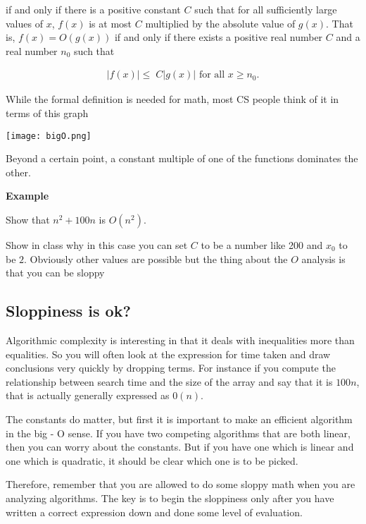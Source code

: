 \documentclass[12pt]{article}
\begin{document}
if and only if there is a positive constant $C$ such that for all sufficiently large values of $x$, $f(x)$ is at most $C$ multiplied by the absolute value of $g(x)$. That is, $f(x) = O(g(x))$ if and only if there exists a positive real number $C$ and a real number $n_0$ such that

\begin{align*}
|f(x)| \le \; C |g(x)|\text{ for all }x \ge n_0.
\end{align*}

While the formal definition is needed for math, most CS people think of it in terms of this graph

\texttt{[image: bigO.png]}

Beyond a certain point, a constant multiple of one of the functions dominates the other.

\medskip

\textbf{Example}

Show that $n^2 + 100n$ is $O(n^2)$.

\medskip

Show in class why in this case you can set $C$ to be a number like 200 and $x_0$ to be $2$. Obviously other values are possible but the thing about the $O$ analysis is that you can be sloppy


\subsection*{Sloppiness is ok?}

Algorithmic complexity is interesting in that it deals with inequalities more than equalities. So you will often look at the expression for time taken and draw conclusions very quickly by dropping terms. For instance if you compute the relationship between search time and the size of the array and say that it is $100n$, that is actually generally expressed as $0(n)$. 

The constants do matter, but first it is important to make an efficient algorithm in the big - O sense. If you have two competing algorithms that are both linear, then you can worry about the constants. But if you have one which is linear and one which is quadratic, it should be clear which one is to be picked.

Therefore, remember that you are allowed to do some sloppy math when you are analyzing algorithms. The key is to begin the sloppiness only after you have written a correct expression down and done some level of evaluation.
\end{document}
